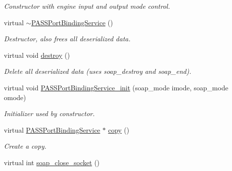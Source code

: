\begin{DoxyCompactItemize}
\begin{DoxyCompactList}\small\item\em Constructor with engine input and output mode control. \item\end{DoxyCompactList}\item 
\hypertarget{classPASSPortBindingService_ae344dff65f12829f587ebc3a942913ed}{
virtual \hyperlink{classPASSPortBindingService_ae344dff65f12829f587ebc3a942913ed}{$\sim$PASSPortBindingService} ()}
\label{classPASSPortBindingService_ae344dff65f12829f587ebc3a942913ed}

\begin{DoxyCompactList}\small\item\em Destructor, also frees all deserialized data. \item\end{DoxyCompactList}\item 
\hypertarget{classPASSPortBindingService_a23e3e486ca4d33cd2aff4f40b621b66d}{
virtual void \hyperlink{classPASSPortBindingService_a23e3e486ca4d33cd2aff4f40b621b66d}{destroy} ()}
\label{classPASSPortBindingService_a23e3e486ca4d33cd2aff4f40b621b66d}

\begin{DoxyCompactList}\small\item\em Delete all deserialized data (uses soap\_\-destroy and soap\_\-end). \item\end{DoxyCompactList}\item 
\hypertarget{classPASSPortBindingService_aa468cce4e5c84a71c1bd83a04db9dc2c}{
virtual void \hyperlink{classPASSPortBindingService_aa468cce4e5c84a71c1bd83a04db9dc2c}{PASSPortBindingService\_\-init} (soap\_\-mode imode, soap\_\-mode omode)}
\label{classPASSPortBindingService_aa468cce4e5c84a71c1bd83a04db9dc2c}

\begin{DoxyCompactList}\small\item\em Initializer used by constructor. \item\end{DoxyCompactList}\item 
\hypertarget{classPASSPortBindingService_aae2e56e96c9ba952369a979d00178401}{
virtual \hyperlink{classPASSPortBindingService}{PASSPortBindingService} $\ast$ \hyperlink{classPASSPortBindingService_aae2e56e96c9ba952369a979d00178401}{copy} ()}
\label{classPASSPortBindingService_aae2e56e96c9ba952369a979d00178401}

\begin{DoxyCompactList}\small\item\em Create a copy. \item\end{DoxyCompactList}\item 
\hypertarget{classPASSPortBindingService_a55fab66c32747cc3dd44c30e6c9b584e}{
virtual int \hyperlink{classPASSPortBindingService_a55fab66c32747cc3dd44c30e6c9b584e}{soap\_\-close\_\-socket} ()}
\label{classPASSPortBindingService_a55fab66c32747cc3dd44c30e6c9b584e}


\end{DoxyCompactItemize}
